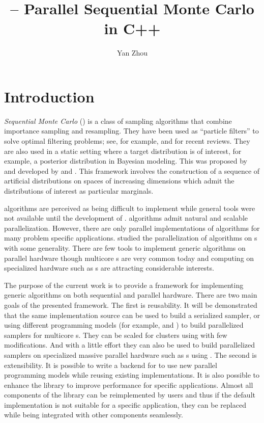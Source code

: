 \documentclass[11pt, fontset=Minion, showoverfull,
bib, mintcode, minted=cache]{marticle}
\title{\protect\vsmc{} -- Parallel Sequential Monte Carlo in C++}
\author{Yan Zhou}
\begin{document}
\maketitle

\section{Introduction}
\label{sec:Introduction}

\emph{Sequential Monte Carlo} (\smc) is a class of sampling algorithms that
combine importance sampling and resampling. They have been used as ``particle
filters'' to solve optimal filtering problems; see, for example,
\textcite{Cappe:2007hz} and \textcite{Doucet:2011us} for recent reviews. They
are also used in a static setting where a target distribution is of interest,
for example, a posterior distribution in Bayesian modeling. This was proposed
by \textcite{DelMoral:2006hc} and developed by \textcite{Peters:2005wh} and
\textcite{DelMoral:2006wv}. This framework involves the construction of a
sequence of artificial distributions on spaces of increasing dimensions which
admit the distributions of interest as particular marginals.

\Smc algorithms are perceived as being difficult to implement while general
tools were not available until the development of \fsmctc \parencite{smctc}.
\Smc algorithms admit natural and scalable parallelization. However, there are
only parallel implementations of \smc algorithms for many problem specific
applications. \textcite{Lee:2010fm} studied the parallelization of \smc
algorithms on \gpu{}s with some generality. There are few tools to implement
generic \smc algorithms on parallel hardware though multicore \cpu{}s are very
common today and computing on specialized hardware such as \gpu{}s are
attracting considerable interests.

The purpose of the current work is to provide a framework for implementing
generic \smc algorithms on both sequential and parallel hardware. There are
two main goals of the presented framework. The first is reusability. It will
be demonstrated that the same implementation source can be used to build a
serialized sampler, or using different programming models (for example,
\fopenmp and \ftbb) to build parallelized samplers for multicore \cpu{}s. They
can be scaled for clusters using \fmpi with few modifications. And with a
little effort they can also be used to build parallelized samplers on
specialized massive parallel hardware such as \gpu{}s using \fopencl. The
second is extensibility. It is possible to write a backend for \vsmc to use
new parallel programming models while reusing existing implementations. It is
also possible to enhance the library to improve performance for specific
applications. Almost all components of the library can be reimplemented by
users and thus if the default implementation is not suitable for a specific
application, they can be replaced while being integrated with other components
seamlessly.
\end{document}
